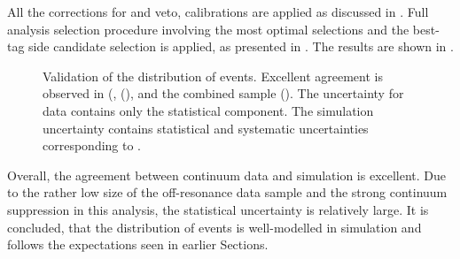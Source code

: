 All the corrections for \piz and \eta veto, \FEI calibrations are applied as discussed in .
Full analysis selection procedure involving the most optimal selections and the best-tag side candidate selection is applied, as presented in .
The results are shown in .
\begin{figure}[htbp!]
    \caption{\label{fig:offresonance_validation} Validation of the \EB distribution of \epem\ra\qqbar events.
    Excellent agreement is observed in \feiBp (, \feiBz (),
    and the combined sample ().
    The uncertainty for data contains only the statistical component.
    The simulation uncertainty contains statistical and systematic uncertainties corresponding to .
    }
\end{figure}

Overall, the agreement between continuum data and simulation is excellent.
Due to the rather low size of the off-resonance data sample and the strong continuum suppression in this analysis, the statistical uncertainty is relatively large.
It is concluded, that the \EB distribution of \epem\ra\qqbar events is well-modelled in simulation and follows the expectations seen in earlier Sections.

